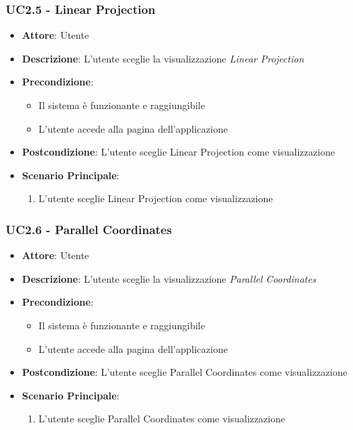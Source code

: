     \subsubsection{UC2.5 - Linear Projection}
    \label{uc2.5}
    
    \begin{itemize}
    \item \textbf{Attore}: Utente
    \item \textbf{Descrizione}: L'utente sceglie la visualizzazione \emph{Linear Projection}
    \item \textbf{Precondizione}:
    \begin{itemize}
        \item Il sistema è funzionante e raggiungibile
        \item L'utente accede alla pagina dell'applicazione
    \end{itemize}
    \item \textbf{Postcondizione}: L'utente sceglie Linear Projection come visualizzazione
    \item \textbf{Scenario Principale}: 
        \begin{enumerate}
            \item L'utente sceglie Linear Projection come visualizzazione
        \end{enumerate}
    \end{itemize}
    
    \subsubsection{UC2.6 - Parallel Coordinates}
    \label{uc2.6}
    
    \begin{itemize}
    \item \textbf{Attore}: Utente
    \item \textbf{Descrizione}: L'utente sceglie la visualizzazione \emph{Parallel Coordinates}
    \item \textbf{Precondizione}:
    \begin{itemize}
        \item Il sistema è funzionante e raggiungibile
        \item L'utente accede alla pagina dell'applicazione
    \end{itemize}
    \item \textbf{Postcondizione}: L'utente sceglie Parallel Coordinates come visualizzazione
    \item \textbf{Scenario Principale}: 
        \begin{enumerate}
            \item L'utente sceglie Parallel Coordinates come visualizzazione
        \end{enumerate}
    \end{itemize}
    
  
